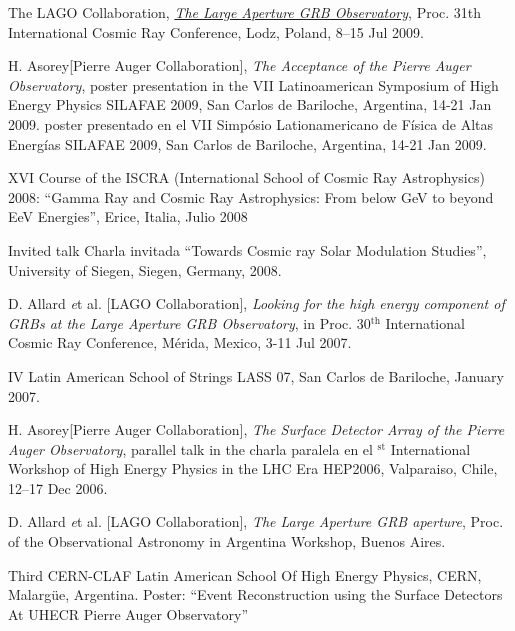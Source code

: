 \begin{etaremune}
\item {}The LAGO Collaboration,
\href{http://arxiv.org/abs/0906.0816}{\emph{The Large Aperture GRB
Observatory}}, \en Proc. 31th International Cosmic Ray Conference, Lodz,
Poland, 8--15 Jul 2009.

\item {}H. Asorey[Pierre Auger Collaboration], {\emph{The Acceptance of the
Pierre Auger Observatory}}, 
\ifeng
poster presentation in the VII Latinoamerican Symposium of High Energy Physics SILAFAE 2009, San Carlos de Bariloche, Argentina, 14-21 Jan 2009.
\else
poster presentado en el VII Simpósio Lationamericano de Física de Altas Energías SILAFAE 2009, San Carlos de Bariloche, Argentina, 14-21 Jan 2009.
\fi

\item {}XVI Course of the ISCRA (International School of Cosmic Ray Astrophysics) 2008: ``Gamma Ray and Cosmic Ray Astrophysics: From below GeV to beyond EeV Energies'', Erice, Italia, Julio 2008

\item {}\ifeng Invited talk \else Charla invitada \fi ``Towards Cosmic ray Solar Modulation Studies'', University of Siegen, Siegen, Germany, 2008.

\item {}D. Allard {\emph et al.} [LAGO Collaboration], {\emph{Looking for the high energy component of GRBs at the Large Aperture GRB Observatory}}, in Proc. 30$^{\mathrm{th}}$ International Cosmic Ray Conference,  Mérida, Mexico, 3-11 Jul 2007.

\item {}IV Latin American School of Strings LASS 07, San Carlos de Bariloche, January 2007.

\item {}H. Asorey[Pierre Auger Collaboration], {\emph{The Surface Detector Array of the Pierre Auger Observatory}}, 
\ifeng
parallel talk in the 
\else
charla paralela en el 
$^{\mathrm{st}}$ International Workshop of High Energy Physics in the LHC Era HEP2006, Valparaiso, Chile, 12--17 Dec 2006.

\item {}D. Allard {\emph et al.} [LAGO Collaboration], {\emph{The Large Aperture GRB aperture}}, \en Proc. of the Observational Astronomy in Argentina Workshop, Buenos Aires.

\item {}Third CERN-CLAF Latin American School Of High Energy Physics, CERN, Malargüe, Argentina. Poster: ``Event Reconstruction using the Surface Detectors At UHECR Pierre Auger Observatory''


\end{etaremune}
